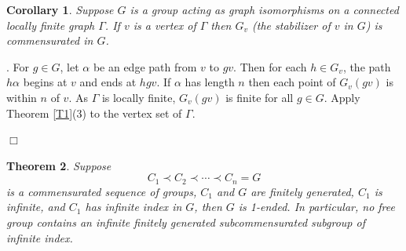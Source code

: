 \documentclass[12pt]{article}
\newtheorem{theorem}{Theorem}[subsection]
\newtheorem{corollary}[theorem]{Corollary}
\newenvironment{proof}{\addvspace{12pt}\noindent{\bf Proof:}}{
$\Box$\par\addvspace{12pt}}
\begin{document}
\begin{corollary}\label{Stabv}
Suppose $G$ is a group acting as graph isomorphisms on a connected locally finite graph $\Gamma$. If $v$ is a vertex of $\Gamma$ then  $G_v$ (the stabilizer of $v$ in $G$) is commensurated in $G$. 
\end{corollary}
\begin{proof}.  For $g\in G$, let $\alpha$ be an edge path from $v$ to $gv$. Then for each $h\in G_v$, the path $h\alpha$ begins at $v$ and ends at $hgv$. If $\alpha$ has length $n$ then each point of $G_v(gv)$ is within $n$ of $v$. As $\Gamma$ is locally finite, $G_v(gv)$ is finite for all $g\in G$. Apply Theorem \ref{T1}(3) to the vertex set of $\Gamma$.
\end{proof}


\begin{theorem}\label{subCend} 
Suppose  
$$C_1\prec C_2\prec \cdots \prec C_n=G$$
is a commensurated sequence of groups, $C_1$ and $G$ are  finitely generated, $C_1$ is infinite, and  $C_1$ has infinite index in $G$, then $G$ is 1-ended. In particular, no free group contains an infinite finitely generated subcommensurated subgroup of infinite index.
\end{theorem} 
\end{document}

